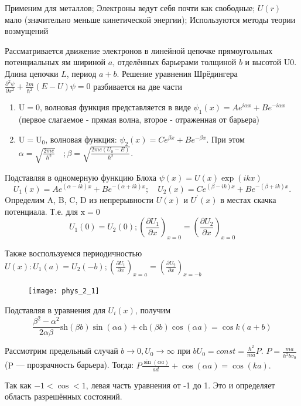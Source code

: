 Применим для металлов; Электроны ведут себя почти как свободные; $U(r)$ мало 
(значительно меньше кинетической энергии); Используются методы теории возмущений 

Рассматривается движение электронов в линейной цепочке прямоугольных потенциальных ям шириной $a$, отделённых барьерами толщиной $b$ и высотой U0. Длина цепочки $L$, период $a+b$.
Решение уравнения Шрёдингера $\frac{\partial^2 \psi}{\partial x^2}+\frac{2 m}{\hbar^2}(E-U) \psi=0$ разбивается на две части

\begin{enumerate}
    \item $\mathrm{U}=0$, волновая функция представляется в виде $\psi_1(x)=A e^{i \alpha x}+B e^{-i \alpha x}$ (первое слагаемое - прямая волна, второе - отраженная от барьера)
    \item $\mathrm{U}=\mathrm{U}_0$, волновая функция: $\psi_2(x)=C e^{\beta x}+B e^{-\beta x}$.
    При этом $\alpha=\sqrt{\frac{2 m e}{\hbar^2}} \quad; \beta=\sqrt{\frac{2 m e\left(U_0-E\right)}{\hbar^2}}$.
\end{enumerate}

Подставляя в одномерную функцию Блоха $\psi(x)=U(x) \exp (i k x)$
$$
U_1(x)=A e^{(\alpha-i k) x}+B e^{-(\alpha+i k) x} ; \quad U_2(x)=C e^{(\beta-i k) x}+B e^{-(\beta+i k) x} .
$$
Oпределим A, B, C, D из непрерывности $U(x)$ и $U^{\prime}(x)$ в местах скачка потенциала. Т.е. для $\mathrm{x}=0$
$$
U_1(0)=U_2(0) ;\left(\frac{\partial U_1}{\partial x}\right)_{x=0}=\left(\frac{\partial U_2}{\partial x}\right)_{x=0}
$$ 

Также воспользуемся периодичностью $U(x): U_1(a)=U_2(-b) ;\left(\frac{\partial U_1}{\partial x}\right)_{x=a}=\left(\frac{\partial U_2}{\partial x}\right)_{x=-b}$

\begin{figure}[h!]
    \centering
    \texttt{[image: phys\_2\_1]}
\end{figure}


Подставляя в уравнения для $U_i(x)$, получим
$$
\frac{\beta^2-\alpha^2}{2 \alpha \beta} \mathrm{sh} (\beta b) \sin (\alpha a)+\mathrm{ch}(\beta b) \cos (\alpha a)=\cos k(a+b)
$$

Рассмотрим предельный случай $b \rightarrow 0, U_0 \rightarrow \infty$ при $b U_0= const =\frac{\hbar^2}{m a} P$. $\displaystyle P=\frac{m a}{h^2 b v_0}$ ($\mathrm{P}$ --- прозрачность барьера). Тогда: $\displaystyle P \frac{\sin (\alpha a)}{a d}+\cos (\alpha a)=\cos (k a) \text {. }$

Так как $-1<\cos<1$, левая часть уравнения от -1 до 1. Это и определяет область разрешённых состояний.

